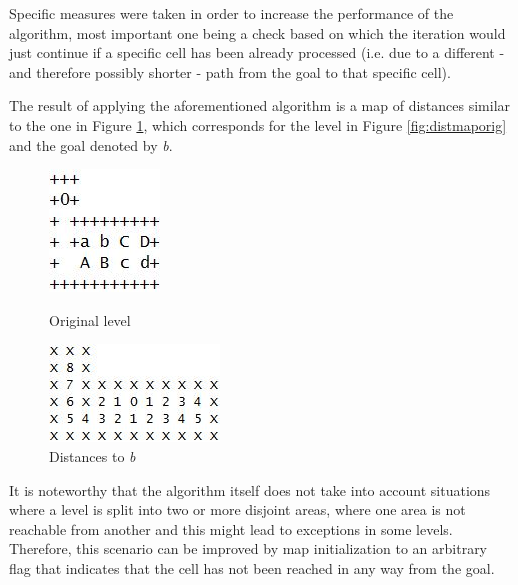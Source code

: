 \documentclass[letterpaper]{article}
\begin{document}
Specific measures were taken in order to increase the performance of the algorithm, most important one being a check based on which the iteration would just continue if a specific cell has been already processed (i.e. due to a different - and therefore possibly shorter - path from the goal to that specific cell).

The result of applying the aforementioned algorithm is a map of distances similar to the one in Figure \ref{fig:distmapb}, which corresponds for the level in Figure \ref{fig:distmaporig} and the goal denoted by \textit{b}.

\begin{figure}[!htb]
\centering
\begin{minipage}[b]{0.45\linewidth}
	\centering
	\includegraphics[scale=0.4]{distmap_orig.JPG}
	\caption{Original level}
	\label{fig:distmaporig}
\end{minipage}
\quad
\begin{minipage}[b]{0.45\linewidth}
	\centering
	\includegraphics[scale=0.5]{distmap_b.JPG}
	\caption{Distances to \textit{b}}
	\label{fig:distmapb}
\end{minipage}
\end{figure}

It is noteworthy that the algorithm itself does not take into account situations where a level is split into two or more disjoint areas, where one area is not reachable from another and this might lead to exceptions in some levels. Therefore, this scenario can be improved by map initialization to an arbitrary flag that indicates that the cell has not been reached in any way from the goal.
\end{document}
